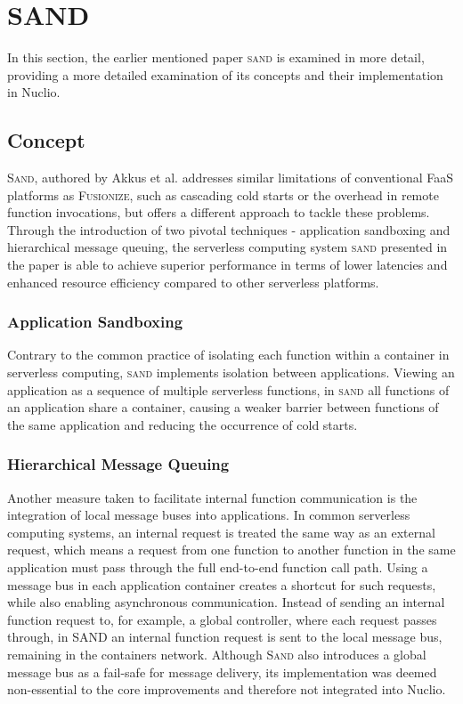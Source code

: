\section{SAND}\label{sec:SAND}

In this section, the earlier mentioned paper \textsc{sand} is examined in more detail, providing a more detailed examination of its concepts and their implementation in Nuclio.

\subsection{Concept}
\textsc{Sand}, authored by Akkus et al. \cite{akkus2018sand} addresses similar limitations of conventional FaaS platforms as \textsc{Fusionize}, such as cascading 
cold starts or the overhead in remote function invocations, but offers a different approach to tackle these problems. Through the introduction of two pivotal 
techniques - application sandboxing and hierarchical message queuing, the serverless computing system \textsc{sand} presented in the paper is able to achieve superior 
performance in terms of lower latencies and enhanced resource efficiency compared to other serverless platforms.

\subsubsection{Application Sandboxing}
Contrary to the common practice of isolating each function within a container in serverless computing, \textsc{sand} implements 
isolation between applications. Viewing an application as a sequence of multiple serverless functions, in \textsc{sand} all functions of an application 
share a container, causing a weaker barrier between functions of the same application and reducing the occurrence of cold starts.

\subsubsection{Hierarchical Message Queuing}
Another measure taken to facilitate internal function communication is the integration of local message buses into applications. 
In common serverless computing systems, an internal request is treated the same way as an external request, which means a request from one function to another 
function in the same application must pass through the full end-to-end function call path. Using a message bus in each application container creates a shortcut for such requests, 
while also enabling asynchronous communication. Instead of sending an internal function request to, for example, a global controller, where each request passes through, in SAND 
an internal function request is sent to the local message bus, remaining in the containers network. Although \textsc{Sand} also introduces a global message bus as a fail-safe 
for message delivery, its implementation was deemed non-essential to the core improvements and therefore not integrated into Nuclio.

